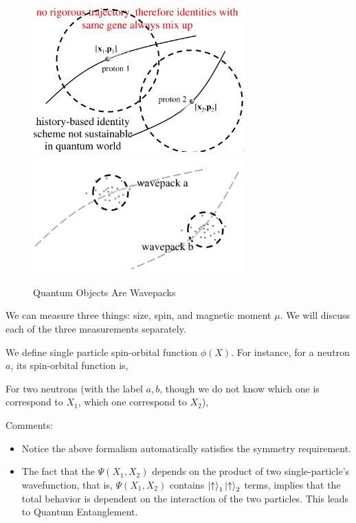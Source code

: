 \documentclass{school-22.101-notes}
\begin{document}
\begin{figure}[ht]
  \includegraphics[width=3.2in]{images/ns/quantum-identity.png}
  \includegraphics[width=3.2in]{images/ns/quantum-identity-2.png}
  \caption{Quantum Objects Are Wavepacks} \label{quantum-identity}
\end{figure}





We can measure three things: size, spin, and magnetic moment $\mu$. We will discuss each of the three measurements separately. 


We define single particle spin-orbital function $\phi(X)$. For instance, for a neutron $a$, its spin-orbital function is, 

For two neutrons (with the label $a,b$, though we do not know which one is correspond to $X_1$, which one correspond to $X_2$), 

Comments: 
\begin{itemize}
\item Notice the above formalism automatically satisfies the symmetry requirement. 
\item The fact that the $\Psi(X_1, X_2)$ depends on the product of two single-particle's wavefunction, that is, $\Psi(X_1, X_2)$ contains $\left| \uparrow \right>_1 \left| \uparrow \right>_2$ terms, implies that the total behavior is dependent on the interaction of the two particles. This leads to Quantum Entanglement. 
\end{itemize}
\end{document}
